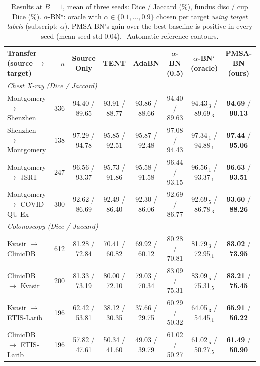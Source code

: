 \documentclass{article}
\newcommand{\B}[1]{\textbf{#1}}
\begin{document}
\begin{table}[t]
\centering
\caption{Results at $B{=}1$, mean of three seeds: Dice / Jaccard (\%), fundus disc / cup Dice (\%). $\alpha$-BN$^\star$: oracle with $\alpha\in\{0.1,\dots,0.9\}$
chosen per target \emph{using target labels} (subscript: $\alpha$). PMSA-BN's gain over the best baseline is positive in every seed (mean seed std 0.04).
$^\dagger$Automatic reference contours.}
\label{tab:main}
\footnotesize
\setlength{\tabcolsep}{3pt}
\renewcommand{\arraystretch}{0.92}
\begin{tabular}{lrcccccc}
\toprule
Transfer (source $\to$ target) & $n$ & Source Only & TENT & AdaBN & $\alpha$-BN (0.5) & $\alpha$-BN$^\star$ (oracle) & PMSA-BN (ours)\\
\midrule
\multicolumn{8}{l}{\emph{Chest X-ray (Dice / Jaccard)}}\\
 Montgomery $\to$ Shenzhen & 336 & 94.40 / 89.65 & 93.91 / 88.77 & 93.86 / 88.66 & 94.40 / 89.63 & 94.43$_{.3}$ / 89.69$_{.3}$ & \B{94.69} / \B{90.13} \\
 Shenzhen $\to$ Montgomery & 138 & 97.29 / 94.78 & 95.85 / 92.51 & 95.87 / 92.48 & 97.08 / 94.43 & 97.34$_{.1}$ / 94.88$_{.1}$ & \B{97.44} / \B{95.06} \\
 Montgomery $\to$ JSRT & 247 & 96.56 / 93.37 & 95.73 / 91.86 & 95.58 / 91.58 & 96.44 / 93.15 & 96.56$_{.1}$ / 93.37$_{.1}$ & \B{96.63} / \B{93.51} \\
 Montgomery $\to$ COVID-QU-Ex & 300 & 92.62 / 86.69 & 92.49 / 86.40 & 92.30 / 86.06 & 92.69 / 86.77 & 92.69$_{.5}$ / 86.78$_{.3}$ & \B{93.60} / \B{88.26} \\
\midrule
\multicolumn{8}{l}{\emph{Colonoscopy (Dice / Jaccard)}}\\
 Kvasir $\to$ ClinicDB & 612 & 81.28 / 72.84 & 70.41 / 60.82 & 69.92 / 60.12 & 80.28 / 70.81 & 81.79$_{.3}$ / 72.95$_{.1}$ & \B{83.02} / \B{73.95} \\
 ClinicDB $\to$ Kvasir & 200 & 81.33 / 73.19 & 80.00 / 72.10 & 79.03 / 70.34 & 83.09 / 75.31 & 83.09$_{.5}$ / 75.31$_{.5}$ & \B{83.21} / \B{75.45} \\
 Kvasir $\to$ ETIS-Larib & 196 & 62.42 / 53.81 & 38.12 / 30.35 & 37.66 / 29.75 & 60.29 / 50.32 & 64.05$_{.3}$ / 54.45$_{.1}$ & \B{65.91} / \B{56.22} \\
 ClinicDB $\to$ ETIS-Larib & 196 & 57.82 / 47.61 & 50.34 / 41.60 & 49.03 / 39.79 & 61.02 / 50.27 & 61.02$_{.5}$ / 50.27$_{.5}$ & \B{61.49} / \B{50.90} \\
\midrule

\end{tabular}
\end{table}
\end{document}
